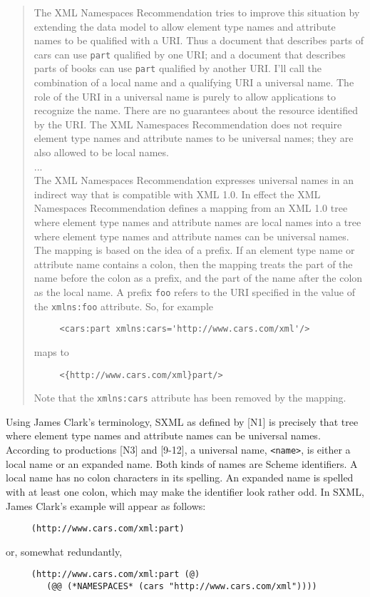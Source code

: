 \documentclass[10pt]{article}
\begin{document}
\begin{quote}
The XML Namespaces Recommendation tries to improve this
situation by extending the data model to allow element type names and
attribute names to be qualified with a URI. Thus a document that
describes parts of cars can use \texttt{part} qualified by one URI; and a
document that describes parts of books can use \texttt{part} qualified by
another URI. I'll call the combination of a local name and a
qualifying URI a universal name. The role of the URI in a universal
name is purely to allow applications to recognize the name. There are
no guarantees about the resource identified by the URI. The XML
Namespaces Recommendation does not require element type names and
attribute names to be universal names; they are also allowed to be
local names.\\ ...\\ The XML Namespaces Recommendation expresses universal names in an
indirect way that is compatible with XML 1.0. In effect the XML
Namespaces Recommendation defines a mapping from an XML 1.0 tree where
element type names and attribute names are local names into a tree
where element type names and attribute names can be universal
names. The mapping is based on the idea of a prefix. If an element
type name or attribute name contains a colon, then the mapping treats
the part of the name before the colon as a prefix, and the part of the
name after the colon as the local name. A prefix \texttt{foo}
refers to the URI specified in the value of the \texttt{xmlns:foo}
attribute. So, for example\begin{verbatim}
     <cars:part xmlns:cars='http://www.cars.com/xml'/>
\end{verbatim}
maps to\begin{verbatim}
     <{http://www.cars.com/xml}part/>
\end{verbatim}
Note that the \texttt{xmlns:cars} attribute has been removed by the mapping.\end{quote}
Using James Clark's terminology, SXML as defined by [N1] is
precisely that tree where element type names and attribute names can
be universal names.  According to productions [N3] and [9-12], a
universal name, \texttt{<name>}, is either a local name or an expanded
name. Both kinds of names are Scheme identifiers. A local name has no
colon characters in its spelling. An expanded name is spelled with at
least one colon, which may make the identifier look rather odd. In
SXML, James Clark's example will appear as follows:\begin{verbatim}
     (http://www.cars.com/xml:part)
\end{verbatim}
or, somewhat redundantly, \begin{verbatim}
     (http://www.cars.com/xml:part (@)
        (@@ (*NAMESPACES* (cars "http://www.cars.com/xml"))))
\end{verbatim}
\end{document}
